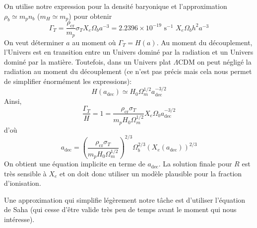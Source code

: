 \documentclass{article}
\numberwithin{equation}{section}
\begin{document}
On utilise notre expression pour la densité baryonique et 
l'approximation $\rho_b \simeq m_p n_b$ ($m_H \simeq m_p$) pour 
obtenir
\[
        \Gamma_T = %
        \frac{\rho_{\text{cr}}}{m_p} \sigma_T
        X_e \Omega_b a^{-3} 
        = 2.2396\times 10^{-19}\,\,\text{s}^{-1} \,\,X_e \Omega_b h^2 a^{-3}
\]
On veut déterminer $a$ au moment où $\Gamma_T = H(a)$. Au moment 
du découplement,
l'Univers est en transition entre un 
Univers dominé par la radiation et un Univers dominé par la 
matière. 
Toutefois, dans un Univers plat $\Lambda \text{CDM}$ on 
peut négligé la radiation au moment du découplement (ce n'est 
pas précis mais cela nous permet de simplifier énormément les expressions): 
\[
        H(a_{\text{dec}}) \simeq H_0  \Omega_m^{1/2} a_{\text{dec}}^{-3/2}
\]
Ainsi,
\[
        \frac{\Gamma_T}{H} = 1 = 
        \frac{\rho_{\text{cr}} \sigma_T}{m_p H_0 \Omega_m^{1/2}}
        X_e \Omega_b a_{\text{dec}}^{-3/2}
\]
d'où
\begin{equation}\label{eq:a_dec} 
        a_{\text{dec}} = 
        \left( \frac{\rho_{\text{cr}} \sigma_T}{m_p H_0 \Omega_m^{1/2}} \right)^{2/3}
        \Omega_b^{2/3}(X_e(a_{\text{dec}}))^{2/3}
\end{equation} 
On obtient une équation implicite en terme de $a_{\text{dec}}$. La solution 
finale pour $R$ est très sensible à $X_e$ et on doit donc utiliser un modèle 
plausible pour la fraction d'ionisation.

Une approximation qui simplifie légèrement notre tâche est d'utiliser 
l'équation de Saha (qui cesse d'être valide très peu de temps 
avant le moment qui nous intéresse). 
\end{document}

